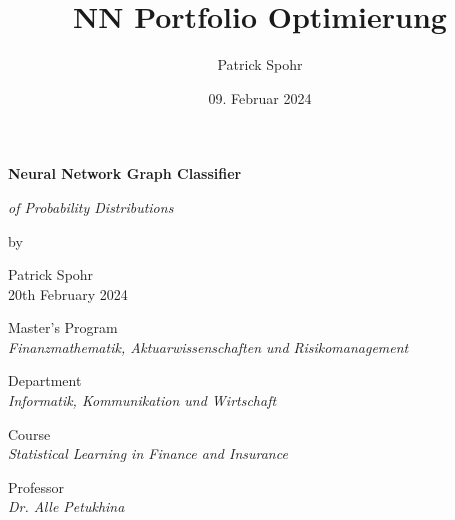 \documentclass[12pt]{article}
\title{NN Portfolio Optimierung}
\date{09. Februar 2024}
\author{Patrick Spohr}
\begin{document}
    \begin{titlepage}
        
        \centering
        \Huge \textbf{Neural Network Graph Classifier}

        \vspace{7mm}
        
        \centering
        \Large \textit{of Probability Distributions} 

        \vspace{7mm}

        \centering
        \large by

        \vspace{7mm}

        \large Patrick Spohr
        \vspace{2mm}
        \\ 20th February 2024

        \vspace{30mm}

        \centering
        \large Master’s Program
        \vspace{1mm}
        \\ \normalsize \textit{Finanzmathematik, Aktuarwissenschaften und Risikomanagement} 

        \vspace{5mm}

        \centering
        \large Department
        \vspace{1mm}
        \\ \normalsize \textit{Informatik, Kommunikation und Wirtschaft} 

        \vspace{5mm}

        \centering
        \large Course 
        \vspace{1mm}       
        \\ \normalsize \textit{Statistical Learning in Finance and Insurance} 

        \vspace{5mm}

        \centering
        \large Professor
        \vspace{1mm}
        \\ \normalsize \textit{Dr. Alle Petukhina} 


    \end{titlepage}

    \hypertarget{Table of Contents}{\tableofcontents}

    \newpage
\end{document}
